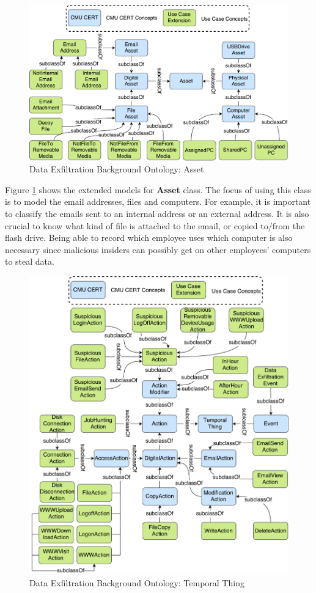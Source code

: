 \begin{figure}[!htbp]
	\centering
    \includegraphics[width=5in]{img/5-dxoasset.pdf}
    \caption{Data Exfiltration Background Ontology: Asset}
    \label{fig:asset}
\end{figure}

Figure \ref{fig:asset} shows the extended models for \textbf{Asset} class.
The focus of using this class is to model the email addresses, files and computers. 
For example, it is important to classify the emails sent to an internal address or an external address. 
It is also crucial to know what kind of file is attached to the email, or copied to/from the flash drive. 
Being able to record which employee uses which computer is also necessary since malicious insiders can possibly get on other employees' computers to steal data. 

\begin{figure}[!htbp]
	\centering
    \includegraphics[width=5in]{img/5-dxott.pdf}
    \caption{Data Exfiltration Background Ontology: Temporal Thing}
    \label{fig:tt}
\end{figure}

